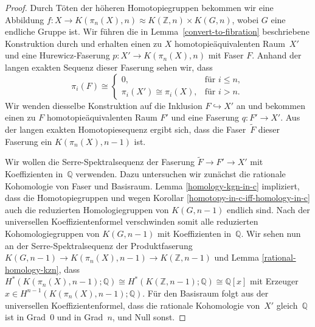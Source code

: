 \documentclass[11pt, a4paper, german]{article}
\theoremstyle{definition}
\theoremstyle{remark}
\newcommand{\Z}{\mathbb{Z}} %
\newcommand{\Q}{\mathbb{Q}} %
\begin{document}
\begin{proof}
  Durch Töten der höheren Homotopiegruppen bekommen wir eine Abbildung $f : X \to K(\pi_n(X), n) \approx K(\Z, n) \times K(G, n)$, wobei $G$ eine endliche Gruppe ist.
  Wir führen die in Lemma~\ref{convert-to-fibration} beschriebene Konstruktion durch und erhalten einen zu $X$ homotopieäquivalenten Raum~$X'$ und eine Hurewicz-Faserung $p : X' \to K(\pi_n(X), n)$ mit Faser $F$.
  Anhand der langen exakten Sequenz dieser Faserung sehen wir, dass
  \[
    \pi_i(F) \cong \begin{cases}
      0, & \text{für $i \leq n$}, \\
      \pi_i(X') \cong \pi_i(X), & \text{für $i > n$.}
    \end{cases}
  \]
  Wir wenden diesselbe Konstruktion auf die Inklusion $F \hookrightarrow X'$ an und bekommen einen zu $F$ homotopieäquivalenten Raum $F'$ und eine Faserung $q : F' \to X'$.
  Aus der langen exakten Homotopiesequenz ergibt sich, dass die Faser~$\tilde{F}$ dieser Faserung ein $K(\pi_n(X), n{-}1)$ ist.

  Wir wollen die Serre-Spektralsequenz der Faserung $\tilde{F} \to F' \to X'$ mit Koeffizienten in~$\Q$ verwenden.
  Dazu untersuchen wir zunächst die rationale Kohomologie von Faser und Basisraum.
  Lemma \ref{homology-kgn-in-c} impliziert, dass die Homotopiegruppen und wegen Korollar \ref{homotopy-in-c-iff-homology-in-c} auch die reduzierten Homologiegruppen von $K(G, n{-}1)$ endlich sind.
  Nach der universellen Koeffizientenformel verschwinden somit alle reduzierten Kohomologiegruppen von $K(G, n{-}1)$ mit Koeffizienten in~$\Q$.
  Wir sehen nun an der Serre-Spektralsequenz der Produktfaserung $K(G, n{-}1) \to K(\pi_n(X), n{-}1) \to K(\Z, n{-}1)$ und Lemma \ref{rational-homology-kzn}, dass $H^*(K(\pi_n(X), n{-}1); \Q) \cong H^*(K(\Z, n{-}1); \Q) \cong \Q[x]$ mit Erzeuger $x \in H^{n-1}(K(\pi_n(X), n{-}1); \Q)$.
  Für den Basisraum folgt aus der universellen Koeffizientenformel, dass die rationale Kohomologie von~$X'$ gleich~$\Q$ ist in Grad~$0$ und in Grad~$n$, und Null sonst.


\end{proof}
\end{document}
